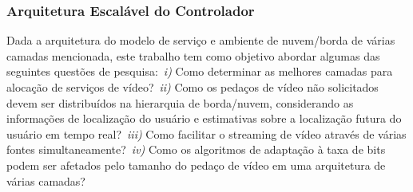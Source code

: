 


\subsubsection{Arquitetura Escalável do Controlador}
\label{subsec:sca-contrl-arch}

Dada a arquitetura do modelo de serviço e ambiente de nuvem/borda de várias camadas mencionada, este trabalho tem como objetivo abordar algumas das seguintes questões de pesquisa:~\textit{i)} Como determinar as melhores camadas para alocação de serviços de vídeo?~\textit{ii)} Como os pedaços de vídeo não solicitados devem ser distribuídos na hierarquia de borda/nuvem, considerando as informações de localização do usuário e estimativas sobre a localização futura do usuário em tempo real?~\textit{iii)} Como facilitar o streaming de vídeo através de várias fontes simultaneamente?~\textit{iv)} Como os algoritmos de adaptação à taxa de bits podem ser afetados pelo tamanho do pedaço de vídeo em uma arquitetura de várias camadas?

